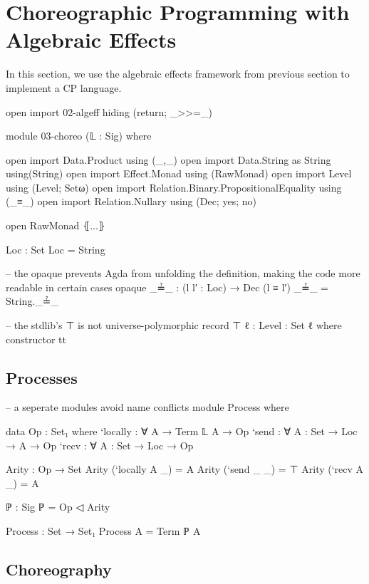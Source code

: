 \section{Choreographic Programming with Algebraic Effects}

In this section, we use the algebraic effects framework from previous section to implement a CP language.

\begin{code}[hide]
open import 02-algeff hiding (return; _>>=_)

module 03-choreo (𝕃 : Sig) where

open import Data.Product using (_,_)
open import Data.String as String using(String)
open import Effect.Monad using (RawMonad)
open import Level using (Level; Setω)
open import Relation.Binary.PropositionalEquality using (_≡_)
open import Relation.Nullary using (Dec; yes; no)

open RawMonad ⦃...⦄

Loc : Set
Loc = String

-- the opaque prevents Agda from unfolding the definition, making the code more readable in certain cases
opaque
  _≟_ : (l l′ : Loc) → Dec (l ≡ l′)
  _≟_ = String._≟_

-- the stdlib's ⊤ is not universe-polymorphic
record ⊤ {ℓ : Level} : Set ℓ where
  constructor tt
\end{code}

\subsection{Processes}

\begin{code}[hide]
-- a seperate modules avoid name conflicts
module Process where
\end{code}

\begin{code}
  data Op : Set₁ where
    `locally : ∀ {A} → Term 𝕃 A → Op
    `send    : ∀ {A : Set} → Loc → A → Op
    `recv    : ∀ {A : Set} → Loc → Op

  Arity : Op → Set
  Arity (`locally {A} _) = A
  Arity (`send _ _) = ⊤
  Arity (`recv {A} _) = A

  ℙ : Sig
  ℙ = Op ◁ Arity

  Process : Set → Set₁
  Process A = Term ℙ A
\end{code}  

\subsection{Choreography}

